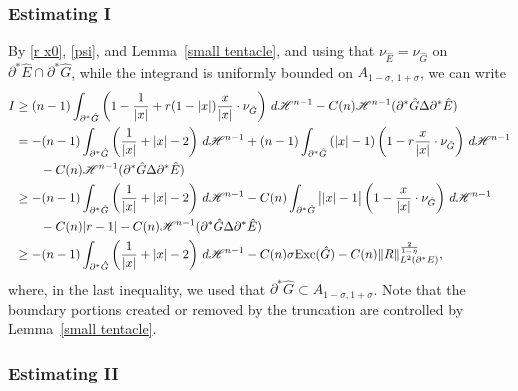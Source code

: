 \documentclass[reqno,11pt]{amsart}
\def\sz{\sigma}
\numberwithin{equation}{section}
\theoremstyle{remark}
\begin{document}
\subsubsection*{Estimating I}
By  \eqref{r x0}, \eqref{psi}, and Lemma~\ref{small tentacle}, and using that $\nu_{\hat E}=\nu_{\hat G}$ on $\partial^*\hat E\cap \partial^*\hat G$, while the integrand is uniformly bounded on $A_{1-\sigma,\,1+\sigma}$, we can write 
\begin{align}
I&\geq (n-1)\int_{\partial^* \hat G}  \left(1-\frac{1}{|x|}+r(1-|x|)\frac{x}{|x|}\cdot \nu_{\hat G}\right) \, d\mathscr H^{n-1}- C(n)\mathscr H^{n-1}(\partial^*  \hat G\Delta \partial^*  \hat E)\nonumber \\ 
& =   -(n-1)\int_{\partial^* \hat G}  \left(\frac{1}{|x|}+|x|-2\right)\, d\mathscr H^{n-1} +(n-1)\int_{\partial^* \hat G}\left(|x|-1\right)\left(1-r\frac{x}{|x|}\cdot \nu_{\hat G}\right) \, d\mathscr H^{n-1}\nonumber\\
&\qquad - C(n)\mathscr H^{n-1}(\partial^*  \hat G\Delta \partial^*  \hat E)\nonumber\\
&\geq   -(n-1)\int_{\partial^* \hat G}  \left(\frac{1}{|x|}+|x|-2\right)\, d\mathscr H^{n-1}-C(n)\int_{\partial^* \hat G}\big||x|-1\big| \left(1-\frac{x}{|x|}\cdot \nu_{\hat G}\right) \, d\mathscr H^{n-1}\nonumber\\
&\qquad -C(n)|r-1|- C(n)\mathscr H^{n-1}(\partial^*  \hat G\Delta \partial^*  \hat E)\nonumber\\
& \ge  - (n-1)\int_{\partial^* \hat G}  \left(\frac{1}{|x|}+|x|-2\right)\, d\mathscr H^{n-1} -C(n)\sz{\rm Exc}(\hat G)- C(n)  \| R\|^{\frac 2{1-\eta}}_{L^2(\partial^*E)}, \label{1st term}
\end{align}
where, in the last inequality, we used that $\partial^* \hat G \subset A_{1-\sigma,1+\sigma}$. Note that the boundary portions created or removed by the truncation are controlled by Lemma~\ref{small tentacle}. 




\subsubsection*{Estimating II}
\end{document}
